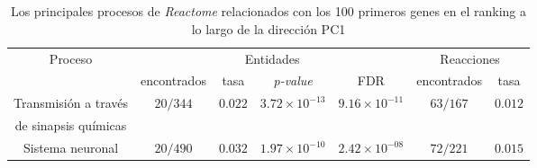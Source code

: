 
\chapter{}\label{apx:apx4}

\begin{table}[!htb]
	\centering
	\caption{Los principales procesos de \textit{Reactome} relacionados con los 100 primeros genes en el ranking a lo largo de la dirección PC1}
	\label{tab:apx4}
	\begin{tabular}{|c|c|c|c|c|c|c|}
		\hline
		\multirow{2}{*}{Proceso} & \multicolumn{4}{c|}{Entidades} & \multicolumn{2}{c|}{Reacciones} \\ \cline{2-7}
		 & encontrados & tasa & \textit{p-value} & FDR & encontrados & tasa \\ \hline
		 Transmisión a través  & \multirow{2}{*}{$20/344$} & \multirow{2}{*}{$0.022$} & \multirow{2}{*}{$3.72 \times 10^{-13}$} & \multirow{2}{*}{$9.16 \times 10^{-11}$} & \multirow{2}{*}{$63/167$} & \multirow{2}{*}{$0.012$} \\
		 de sinapsis químicas & & & & & & \\ \hline
		 
		 Sistema neuronal & $20/490$ & $0.032$ & $1.97 \times 10 ^{-10}$ & $2.42 \times 10^{-08}$ & $72/221$ & $0.015$ \\ \hline
		 
		 
	\end{tabular}
\end{table}